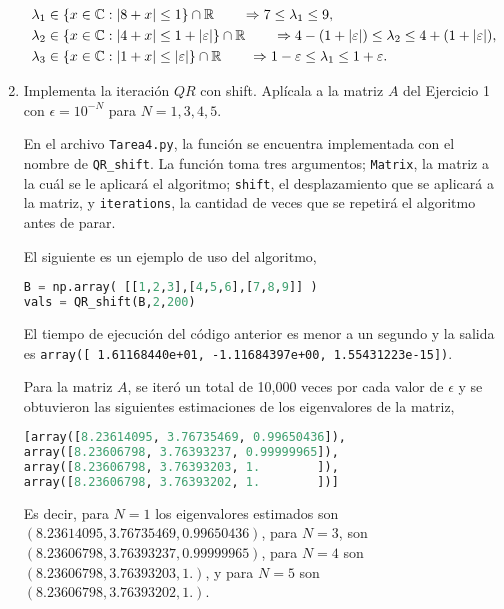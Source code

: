 \documentclass{article}
\renewcommand{\C}{\mathbb{C}}
\begin{document}
\begin{enumerate}
    \begin{align*}
        \lambda_1 &\in \{ x \in \C : |8 + x| \le 1 \}\cap \R \qquad \Rightarrow 7 \le \lambda_1 \le 9,\\
        \lambda_2 &\in \{ x \in \C : |4 + x| \le 1 + |\epsilon| \}\cap\R \qquad
        \Rightarrow 4 - (1 + |\epsilon|) \le \lambda_2 \le 4 + (1 + |\epsilon|),\\
        \lambda_3 &\in \{ x \in \C : |1+x| \le |\epsilon|\}\cap\R \qquad 
        \Rightarrow 1 - \epsilon \le \lambda_1 \le 1 + \epsilon.
    \end{align*}


    \item Implementa la iteración $QR$ con shift. Aplícala a la matriz $A$ del 
    Ejercicio 1 con $\epsilon = 10^{-N}$ para $N = 1, 3, 4, 5$.

    En el archivo \texttt{Tarea4.py}, la función se encuentra implementada con el nombre de
    \texttt{QR\_shift}. La función toma tres argumentos; \texttt{Matrix}, la matriz a la cuál se le aplicará
    el algoritmo; \texttt{shift}, el desplazamiento que se aplicará a la matriz, y \texttt{iterations},
    la cantidad de veces que se repetirá el algoritmo antes de parar.

    El siguiente es un ejemplo de uso del algoritmo,

    \begin{lstlisting}[language=Python]
B = np.array( [[1,2,3],[4,5,6],[7,8,9]] )
vals = QR_shift(B,2,200)\end{lstlisting}

    El tiempo de ejecución del código anterior es menor a un segundo y la salida es \texttt{array([ 1.61168440e+01, -1.11684397e+00,  1.55431223e-15])}.
        
    Para la matriz $A$, se iteró un total de 10,000 veces por cada valor de $\epsilon$ y se obtuvieron
    las siguientes estimaciones de los eigenvalores de la matriz,

    \begin{lstlisting}[language=Python]
[array([8.23614095, 3.76735469, 0.99650436]),
array([8.23606798, 3.76393237, 0.99999965]),
array([8.23606798, 3.76393203, 1.        ]),
array([8.23606798, 3.76393202, 1.        ])]\end{lstlisting}

        Es decir, para $N=1$ los eigenvalores estimados son $(8.23614095, 3.76735469, 0.99650436)$,
        para $N=3$, son $(8.23606798, 3.76393237, 0.99999965)$, para $N=4$ son $(8.23606798, 3.76393203, 1.)$,
        y para $N=5$ son $(8.23606798, 3.76393202, 1.)$.
    

\end{enumerate}
\end{document}
